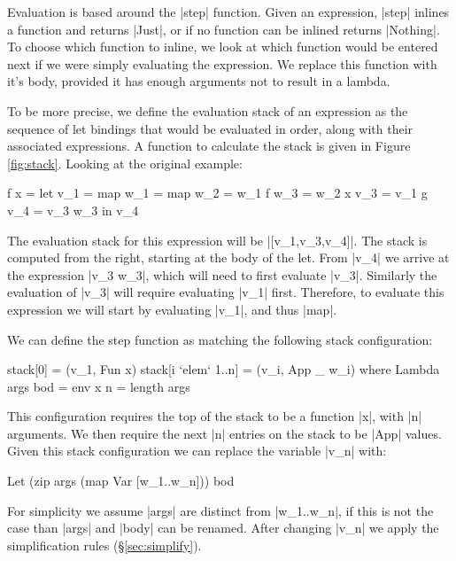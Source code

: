 \documentclass[draft]{sigplanconf}
\begin{document}
Evaluation is based around the |step| function. Given an expression, |step| inlines a function and returns |Just|, or if no function can be inlined returns |Nothing|. To choose which function to inline, we look at which function would be entered next if we were simply evaluating the expression. We replace this function with it's body, provided it has enough arguments not to result in a lambda.

To be more precise, we define the evaluation stack of an expression as the sequence of let bindings that would be evaluated in order, along with their associated expressions. A function to calculate the stack is given in Figure \ref{fig:stack}. Looking at the original example:

\begin{code}
\g f x =  let  v_1 = map
               w_1 = map
               w_2 = w_1 f
               w_3 = w_2 x
               v_3 = v_1 g
               v_4 = v_3 w_3
          in   v_4
\end{code}

The evaluation stack for this expression will be |[v_1,v_3,v_4]|. The stack is computed from the right, starting at the body of the let. From |v_4|  we arrive at the expression |v_3 w_3|, which will need to first evaluate |v_3|. Similarly the evaluation of |v_3| will require evaluating |v_1| first. Therefore, to evaluate this expression we will start by evaluating |v_1|, and thus |map|.

We can define the step function as matching the following stack configuration:

\begin{code}
stack[0]              = (v_1, Fun x)
stack[i `elem` 1..n]  = (v_i, App _ w_i)
    where  Lambda args bod = env x
           n = length args
\end{code}

This configuration requires the top of the stack to be a function |x|, with |n| arguments. We then require the next |n| entries on the stack to be |App| values. Given this stack configuration we can replace the variable |v_n| with:

\begin{code}
Let (zip args (map Var [w_1..w_n])) bod
\end{code}

For simplicity we assume |args| are distinct from |w_1..w_n|, if this is not the case than |args| and |body| can be renamed. After changing |v_n| we apply the simplification rules (\S\ref{sec:simplify}).
\end{document}
